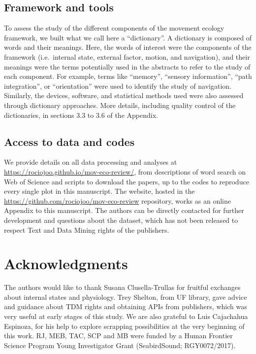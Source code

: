 \documentclass[a4paper,12pt]{article}
\begin{document}
\subsection*{Framework and tools}

To assess the study of the different components of the movement ecology
framework, we built what we call here a ``dictionary''. A dictionary is
composed of words and their meanings. Here, the words of interest were
the components of the framework (i.e.~internal state, external factor,
motion, and navigation), and their meanings were the terms potentially
used in the abstracts to refer to the study of each component. For
example, terms like ``memory'', ``sensory information'', ``path
integration'', or ``orientation'' were used to identify the study of
navigation. Similarly, the devices, software, and statistical methods
used were also assessed through dictionary approaches. More details,
including quality control of the dictionaries, in sections 3.3 to 3.6 of
the Appendix.

\subsection*{Access to data and codes}

We provide details on all data processing and analyses at
\url{https://rociojoo.github.io/mov-eco-review/}, from descriptions of
word search on Web of Science and scripts to download the papers, up to
the codes to reproduce every single plot in this manuscript. The
website, hosted in the \url{https://github.com/rociojoo/mov-eco-review}
repository, works as an online Appendix to this manuscript. The authors can be directly
contacted for further development and questions about the dataset, which
has not been released to respect Text and Data Mining rights of the
publishers.




\section*{Acknowledgments}

The authors would like to thank Susana Clusella-Trullas for fruitful
exchanges about internal states and physiology. Trey Shelton, from UF
library, gave advice and guidance about TDM rights and obtaining APIs
from publishers, which was very useful at early stages of this study. We
are also grateful to Luis Cajachahua Espinoza, for his help to explore
scrapping possibilities at the very beginning of this work. RJ, MEB,
TAC, SCP and MB were funded by a Human Frontier Science Program Young
Investigator Grant (SeabirdSound; RGY0072/2017).
\end{document}
